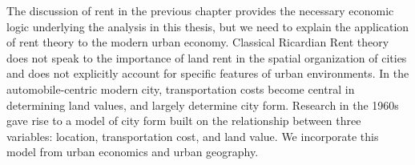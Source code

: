 







The discussion of rent in the previous chapter provides the necessary economic logic
underlying the analysis in this thesis, but we need to explain the application of rent theory to the modern urban economy. Classical Ricardian Rent theory does not speak to the importance of land rent in the spatial organization of cities and does not explicitly account for specific features of urban environments.  In the automobile-centric modern city, transportation costs become central in determining land values, and largely determine city form. Research in the 1960s gave rise to a model of city form built on the relationship between three variables: location, transportation cost, and land value. We incorporate this model from urban economics and urban geography. 

